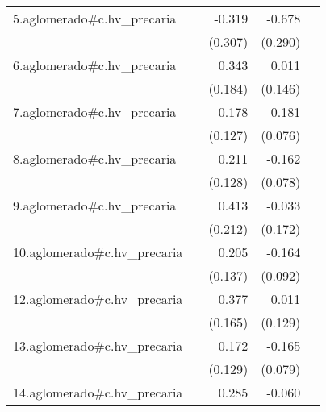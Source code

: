 {\begin{longtable}{l*{4}{D{.}{.}{-1}}}
\addlinespace
5.aglomerado#c.hv\_precaria&                     &      -0.319         &      -0.678\sym{*}  &                     \\
            &                     &     (0.307)         &     (0.290)         &                     \\
\addlinespace
6.aglomerado#c.hv\_precaria&                     &       0.343         &       0.011         &                     \\
            &                     &     (0.184)         &     (0.146)         &                     \\
\addlinespace
7.aglomerado#c.hv\_precaria&                     &       0.178         &      -0.181\sym{*}  &                     \\
            &                     &     (0.127)         &     (0.076)         &                     \\
\addlinespace
8.aglomerado#c.hv\_precaria&                     &       0.211         &      -0.162\sym{*}  &                     \\
            &                     &     (0.128)         &     (0.078)         &                     \\
\addlinespace
9.aglomerado#c.hv\_precaria&                     &       0.413         &      -0.033         &                     \\
            &                     &     (0.212)         &     (0.172)         &                     \\
\addlinespace
10.aglomerado#c.hv\_precaria&                     &       0.205         &      -0.164         &                     \\
            &                     &     (0.137)         &     (0.092)         &                     \\
\addlinespace
12.aglomerado#c.hv\_precaria&                     &       0.377\sym{*}  &       0.011         &                     \\
            &                     &     (0.165)         &     (0.129)         &                     \\
\addlinespace
13.aglomerado#c.hv\_precaria&                     &       0.172         &      -0.165\sym{*}  &                     \\
            &                     &     (0.129)         &     (0.079)         &                     \\
\addlinespace
14.aglomerado#c.hv\_precaria&                     &       0.285         &      -0.060         &                     \\

\end{longtable}}
